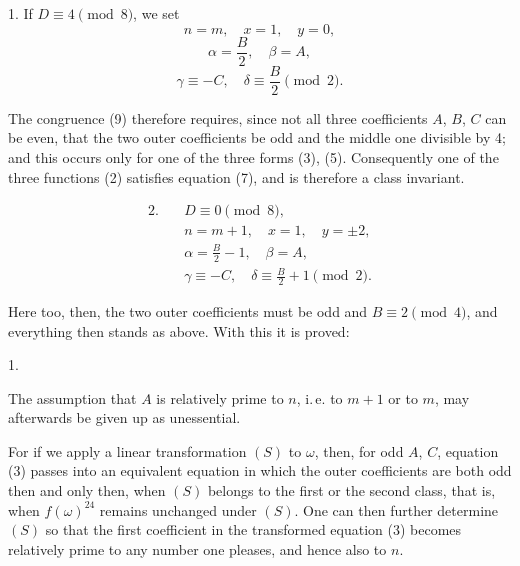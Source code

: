 

1. If $D\equiv 4\pmod{8}$, we set
\[
n=m,\quad x=1,\quad y=0,
\]
\[
\alpha=\frac{B}{2},\quad \beta=A,
\]
\[
\gamma\equiv -C,\quad \delta\equiv\frac{B}{2}\pmod{2}.
\]

The congruence (9) therefore requires, since not all three coefficients $A$, $B$, $C$ can be even, that the two outer coefficients be odd and the middle one divisible by 4; and this occurs only for one of the three forms (3), (5). Consequently one of the three functions (2) satisfies equation (7), and is therefore a class invariant.

\[
\begin{aligned}
2.\quad &D\equiv 0\pmod{8},\\
&n=m+1,\quad x=1,\quad y=\pm 2,\\
&\alpha=\frac{B}{2}-1,\quad \beta=A,\\
&\gamma\equiv -C,\quad \delta\equiv\frac{B}{2}+1\pmod{2}.
\end{aligned}
\]

Here too, then, the two outer coefficients must be odd and $B\equiv 2\pmod{4}$, and everything then stands as above. With this it is proved:

1. 

The assumption that $A$ is relatively prime to $n$, i.\,e. to $m+1$ or to $m$, may afterwards be given up as unessential.

For if we apply a linear transformation $(S)$ to $\omega$, then, for odd $A$, $C$, equation (3) passes into an equivalent equation in which the outer coefficients are both odd then and only then, when $(S)$ belongs to the first or the second class, that is, when $f(\omega)^{24}$ remains unchanged under $(S)$. One can then further determine $(S)$ so that the first coefficient in the transformed equation (3) becomes relatively prime to any number one pleases, and hence also to $n$.
